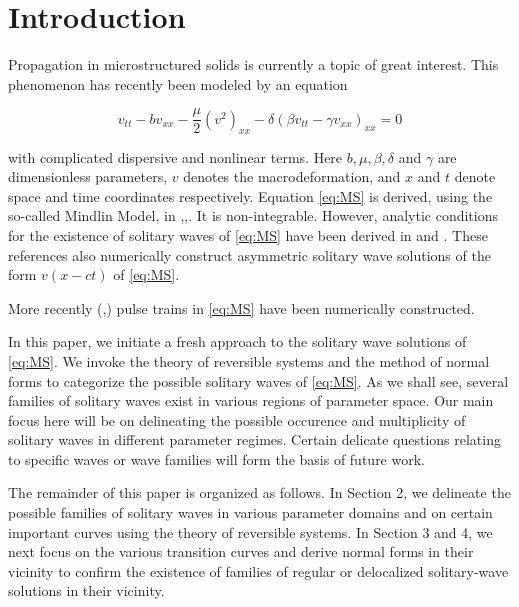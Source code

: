 \section{Introduction}

Propagation in microstructured solids is currently a topic of great interest.
This phenomenon has recently been modeled \cite{STE} by an equation

\begin{equation}\label{eq:MS}
v_{tt} - b v_{xx} - \frac{\mu}{2} \left( v^2 \right)_{xx} - \delta \left( \beta v_{tt} - \gamma v_{xx}\right)_{xx} = 0 
\end{equation}

with complicated dispersive and nonlinear terms. Here $b, \mu, \beta, \delta$
and $\gamma$ are dimensionless parameters, $v$ denotes the macrodeformation,
and $x$ and $t$ denote space and time coordinates respectively.  Equation
\eqref{eq:MS} is derived, using the so-called Mindlin Model, in
\cite{JE1},\cite{JE2},\cite{STE}.  It is non-integrable. However, analytic
conditions for the existence of solitary waves of \eqref{eq:MS} have been
derived in \cite{JE2} and \cite{STE}. These references also numerically
construct asymmetric solitary wave solutions of the form $ v\left(x - c t
\right)$ of \eqref{eq:MS}.

More recently (\cite{EP},\cite{EBS}) pulse trains in \eqref{eq:MS} have been
numerically constructed.

In this paper, we initiate a fresh approach to the solitary wave solutions of
\eqref{eq:MS}.  We invoke the theory of reversible systems and the method of
normal forms to categorize the possible solitary waves of \eqref{eq:MS}.  As we
shall see, several families of solitary waves exist in various regions of
parameter space. Our main focus here will be on delineating the possible
occurence and multiplicity of solitary waves in different parameter regimes.
Certain delicate questions relating to specific waves or wave families will
form the basis of future work. 

The remainder of this paper is organized as follows. In Section 2, we delineate
the possible families of solitary waves in various parameter domains and on
certain important curves using the theory of reversible systems. In Section 3
and 4, we next focus on the various transition curves and derive normal forms
in their vicinity to confirm the existence of families of regular or
delocalized solitary-wave solutions in their vicinity.



